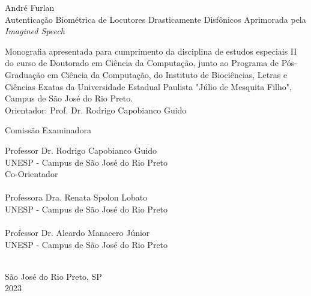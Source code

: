 \documentclass[a4paper,12pt,openright,oneside]{book}
\begin{document}
	\begin{center}
		\vspace{4cm}
		\fontsize{14}{\baselineskip} \selectfont
		\vspace{30.0pt}
		{André Furlan} \\ \vspace{30.0pt}
		{Autenticação Biométrica de Locutores Drasticamente Disfônicos Aprimorada pela \textit{Imagined Speech}} \\ \onehalfspacing \fontsize{14}{\baselineskip} \selectfont
		\par \null
		\begin{flushright}
		\parbox{3.50in}{
			\fontsize{12}{\baselineskip} \selectfont \onehalfspacing
			Monografia apresentada para cumprimento da disciplina de estudos especiais II do curso de Doutorado em Ciência da Computação, junto ao Programa de Pós-Graduação em Ciência da Computação, do Instituto de Biociências, Letras e Ciências Exatas da Universidade Estadual Paulista "Júlio de Mesquita Filho", Campus de São José do Rio Preto. \\ \vspace{1.0pt}
			{Orientador: Prof. Dr. Rodrigo Capobianco Guido } \\ \vspace{1.0pt}
		}
		\end{flushright}
		\fontsize{14}{\baselineskip} \selectfont
		Comissão Examinadora \\  \vspace{1.0pt}
	\end{center}

	\fontsize{14}{\baselineskip} \selectfont
	Professor Dr. Rodrigo Capobianco Guido \\ 
	UNESP - Campus de São José do Rio Preto \\
	Co-Orientador \\\\
	
	Professora Dra. Renata Spolon Lobato \\ 
	UNESP - Campus de São José do Rio Preto \\\\
	
	Professor Dr. Aleardo Manacero Júnior \\
	UNESP - Campus de São José do Rio Preto \\\\
	\vspace{3.0cm}

	\begin{center}
		São José do Rio Preto, SP  \\ \vspace{1.0pt}
		2023
	\end{center}
\end{document}
